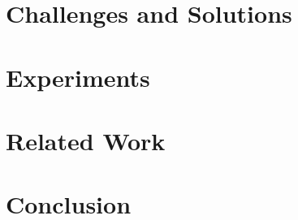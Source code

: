 \documentclass[a4paper,UKenglish]{lipics}
\begin{document}
\section{Challenges and Solutions}
\label{sec:solution}




\section{Experiments}
\label{sec:exp}


\section{Related Work}
\label{sec:rel}


\section{Conclusion}
\label{sec:conc}



	
	
\end{document}
